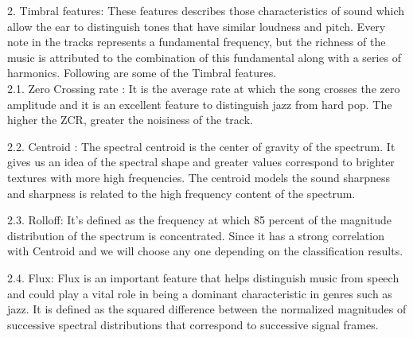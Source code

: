 \documentclass[10pt,a4paper]{article}
\begin{document}
	2.	Timbral features: These features describes those characteristics of sound which allow the ear to distinguish tones that have similar loudness and pitch. Every note in the tracks represents a fundamental frequency, but the richness of the music is attributed to the combination of this fundamental along with a series of harmonics. Following are some of the Timbral features.\\
	
	
	2.1.	Zero Crossing rate : It is the average rate at which the song crosses the zero amplitude and it is an excellent feature to distinguish jazz from hard pop. The higher the ZCR, greater the noisiness of the track.
	
	2.2.	Centroid : The spectral centroid is the center of gravity of the spectrum. It gives us an idea of the spectral shape and greater values correspond to brighter textures with more high frequencies. The centroid models the sound sharpness and sharpness is related to the high frequency content of the spectrum.
	
	2.3.	Rolloff:  It's defined as the frequency at which 85 percent of the magnitude distribution of the spectrum is concentrated. Since it has a strong correlation with Centroid and we will choose any one depending on the classification results.
	
	2.4.	Flux:   Flux is an important feature that helps distinguish music from speech and could play a vital role in being a dominant characteristic in genres such as jazz. It is defined as the squared difference between the normalized magnitudes of successive spectral distributions that correspond to successive signal frames.
	
\end{document}

